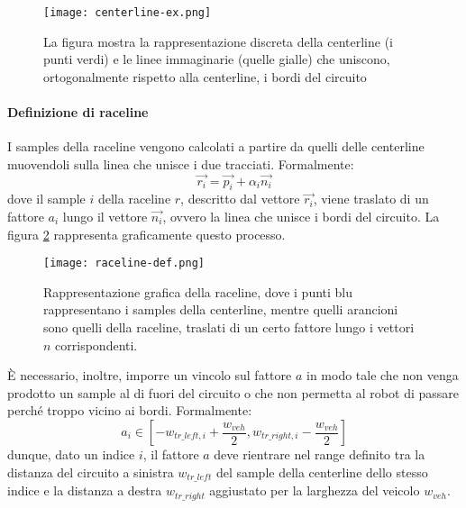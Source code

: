\begin{figure}[h]
	\begin{center}
		\texttt{[image: centerline-ex.png]}
	\end{center}
	\caption{La figura mostra la rappresentazione discreta della centerline (i punti verdi) e le linee
		immaginarie (quelle gialle) che uniscono, ortogonalmente rispetto alla centerline, i bordi
		del circuito}
		\label{fig:centerline-ex}
\end{figure}

\paragraph{Definizione di raceline}
\label{par:raceline}
I samples della raceline vengono calcolati a partire da quelli delle centerline muovendoli sulla linea
che unisce i due tracciati. Formalmente:
\[
	\overrightarrow{r_i} = \overrightarrow{p_i} + \alpha_i \overrightarrow{n_i}
\]
dove il sample $i$ della raceline $r$, descritto dal vettore $\overrightarrow{r_i}$, viene traslato di un
fattore $a_i$ lungo il vettore $\overrightarrow{n_i}$, ovvero la linea che unisce i bordi del circuito.
La figura \ref{fig:raceline-def} rappresenta graficamente questo processo.

\begin{figure}[h]
	\begin{center}
		\texttt{[image: raceline-def.png]}
	\end{center}
	\caption{Rappresentazione grafica della raceline, dove i punti blu rappresentano i samples della
		centerline, mentre quelli arancioni sono quelli della raceline, traslati di un certo fattore lungo i
		vettori $n$ corrispondenti. \cite{lection22}}
	\label{fig:raceline-def}
\end{figure}

È necessario, inoltre, imporre un vincolo sul fattore $a$ in modo tale che non venga prodotto un sample
al di fuori del circuito o che non permetta al robot di passare perché troppo vicino ai bordi.
Formalmente:
\begin{equation}
	a_i \in [ -w_{tr\_left, i} + \frac{w_{veh}}{2}, w_{tr\_right, i} - \frac{w_{veh}}{2}]
	\label{eq:a_constr}
\end{equation}
dunque, dato un indice $i$, il fattore $a$ deve rientrare nel range definito tra la distanza del circuito
a sinistra $w_{tr\_left}$ del sample della centerline dello stesso indice e la distanza a destra
$w_{tr\_right}$ aggiustato per la larghezza del veicolo $w_{veh}$.

